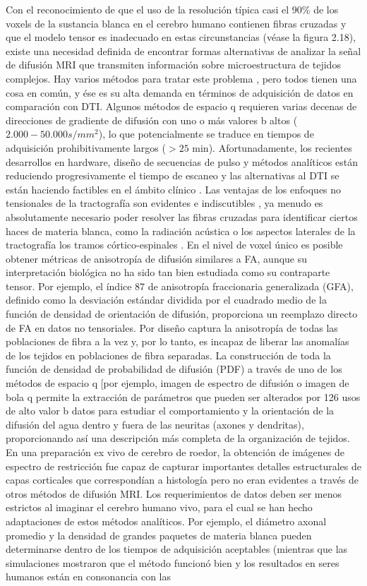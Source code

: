Con el reconocimiento de que el uso de la resolución típica casi el 90\% de los voxels de la sustancia blanca en el cerebro humano contienen fibras cruzadas \cite{119} y que el modelo tensor es inadecuado en estas circunstancias (véase la figura 2.18), existe una necesidad definida de encontrar formas alternativas de analizar la señal de difusión MRI que transmiten información sobre microestructura de tejidos complejos. Hay varios métodos para tratar este problema \cite{120}, pero todos tienen una cosa en común, y ése es su alta demanda en términos de adquisición de datos en comparación con DTI. Algunos métodos de espacio q requieren varias decenas de direcciones de gradiente de difusión con uno o más valores b altos ($2.000-50.000 s/mm^{2}$), lo que potencialmente se traduce en tiempos de adquisición prohibitivamente largos ($> 25$ min). Afortunadamente, los recientes desarrollos en hardware, diseño de secuencias de pulso y métodos analíticos \cite{Tuch_2002,121} están reduciendo progresivamente el tiempo de escaneo y las alternativas al DTI se están haciendo factibles en el ámbito clínico \cite{122}. Las ventajas de los enfoques no tensionales de la tractografía son evidentes e indiscutibles \cite{123}, ya menudo es absolutamente necesario poder resolver las fibras cruzadas para identificar ciertos haces de materia blanca, como la radiación acústica o los aspectos laterales de la tractografía los tramos córtico-espinales \cite{124}. En el nivel de voxel único es posible obtener métricas de anisotropía de difusión similares a FA, aunque su interpretación biológica no ha sido tan bien estudiada como su contraparte tensor. Por ejemplo, el índice 87 de anisotropía fraccionaria generalizada (GFA), definido como la desviación estándar dividida por el cuadrado medio de la función de densidad de orientación de difusión, proporciona un reemplazo directo de FA en datos no tensoriales. Por diseño captura la anisotropía de todas las poblaciones de fibra a la vez y, por lo tanto, es incapaz de liberar las anomalías de los tejidos en poblaciones de fibra separadas. La construcción de toda la función de densidad de probabilidad de difusión (PDF) a través de uno de los métodos de espacio q [por ejemplo, imagen de espectro de difusión \cite{125} o imagen de bola q \cite{Tuch_2004} permite la extracción de parámetros que pueden ser alterados por 126 usos de alto valor b datos para estudiar el comportamiento y la orientación de la difusión del agua dentro y fuera de las neuritas (axones y dendritas), proporcionando así una descripción más completa de la organización de tejidos. En una preparación ex vivo de cerebro de roedor, la obtención de imágenes de espectro de restricción fue capaz de capturar importantes detalles estructurales de capas corticales que correspondían a histología pero no eran evidentes a través de otros métodos de difusión MRI. Los requerimientos de datos deben ser menos estrictos al imaginar el cerebro humano vivo, para el cual se han hecho adaptaciones de estos métodos analíticos. Por ejemplo, el diámetro axonal promedio y la densidad de grandes paquetes de materia blanca pueden determinarse dentro de los tiempos de adquisición aceptables (mientras que las simulaciones mostraron que el método funcionó bien y los resultados en seres humanos están en consonancia con las 